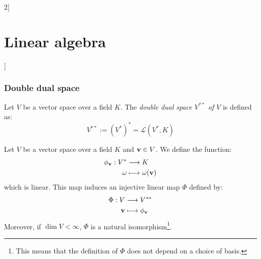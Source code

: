 \documentclass[../../../main.tex]{subfiles}
\begin{document}
\begin{multicols}{2}[\section{Linear algebra}]
  \subsubsection*{Double dual space}
  \begin{definition}
    Let $V$ be a vector space over a field $K$. The \textit{double dual space $V^{**}$ of $V$} is defined as: $$V^{**}:={(V^*)}^*=\mathcal{L}(V^*,K)$$
  \end{definition}
  \begin{prop}
    Let $V$ be a vector space over a field $K$ and $\vb{v}\in V$. We define the function:
    \begin{align*}
      \phi_{\vb{v}}:V^* & \longrightarrow K                \\
      \omega                   & \longmapsto\omega(\vb{v})
    \end{align*}
    which is linear. This map induces an injective linear map $\Phi$ defined by:
    \begin{align*}
      \Phi:V        & \longrightarrow V^{**}          \\
      \vb{v} & \longmapsto\phi_{\vb{v}}
    \end{align*}
    Moreover, if $\dim V<\infty$, $\Phi$ is a natural isomorphism\footnote{This means that the definition of $\Phi$ does not depend on a choice of basis.}.
  \end{prop}

\end{multicols}
\end{document}
